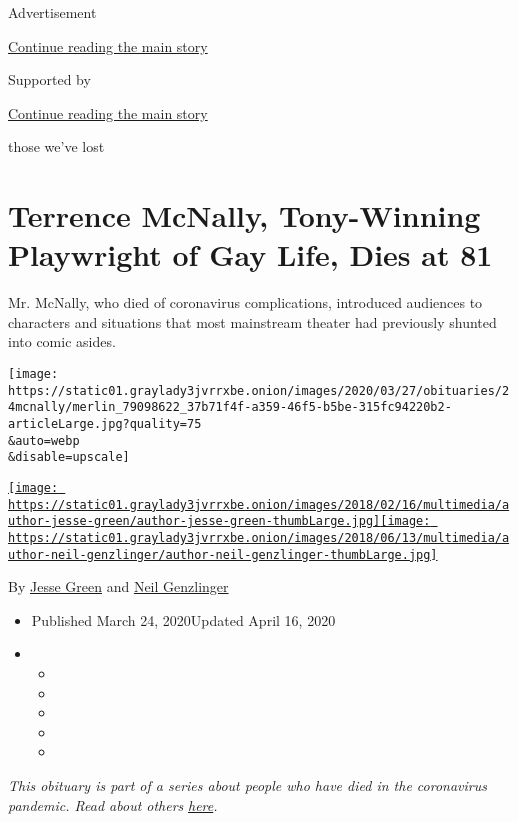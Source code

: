 Advertisement

\protect\hyperlink{after-top}{Continue reading the main story}

Supported by

\protect\hyperlink{after-sponsor}{Continue reading the main story}

those we've lost

\hypertarget{terrence-mcnally-tony-winning-playwright-of-gay-life-dies-at-81}{%
\section{Terrence McNally, Tony-Winning Playwright of Gay Life, Dies at
81}\label{terrence-mcnally-tony-winning-playwright-of-gay-life-dies-at-81}}

Mr. McNally, who died of coronavirus complications, introduced audiences
to characters and situations that most mainstream theater had previously
shunted into comic asides.

\texttt{[image: https://static01.graylady3jvrrxbe.onion/images/2020/03/27/obituaries/24mcnally/merlin\_79098622\_37b71f4f-a359-46f5-b5be-315fc94220b2-articleLarge.jpg?quality=75\\\&auto=webp\\\&disable=upscale]}

\href{https://www.nytimes3xbfgragh.onion/by/jesse-green}{\texttt{[image: https://static01.graylady3jvrrxbe.onion/images/2018/02/16/multimedia/author-jesse-green/author-jesse-green-thumbLarge.jpg]}}\href{https://www.nytimes3xbfgragh.onion/by/neil-genzlinger}{\texttt{[image: https://static01.graylady3jvrrxbe.onion/images/2018/06/13/multimedia/author-neil-genzlinger/author-neil-genzlinger-thumbLarge.jpg]}}

By \href{https://www.nytimes3xbfgragh.onion/by/jesse-green}{Jesse Green}
and \href{https://www.nytimes3xbfgragh.onion/by/neil-genzlinger}{Neil
Genzlinger}

\begin{itemize}
\item
  Published March 24, 2020Updated April 16, 2020
\item
  \begin{itemize}
  \item
  \item
  \item
  \item
  \item
  \end{itemize}
\end{itemize}

\emph{This obituary is part of a series about people who have died in
the coronavirus pandemic. Read about others}
\href{https://www.nytimes3xbfgragh.onion/series/people-who-have-died-of-the-coronavirus}{\emph{here}}\emph{.}

